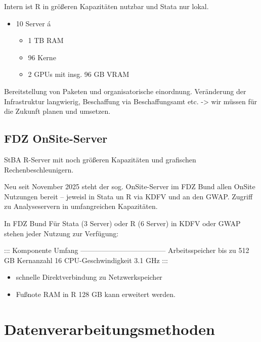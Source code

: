 \documentclass[
  german,
  10pt,
  twoside]{article}
\providecommand{\tightlist}{%
  \setlength{\itemsep}{0pt}\setlength{\parskip}{0pt}}
\begin{document}
Intern ist R in größeren Kapazitäten nutzbar und Stata nur lokal.

\begin{itemize}
\tightlist
\item
  10 Server á

  \begin{itemize}
  \tightlist
  \item
    1 TB RAM
  \item
    96 Kerne
  \item
    2 GPUs mit insg. 96 GB VRAM
  \end{itemize}
\end{itemize}

Bereitstellung von Paketen und organisatorische einordnung. Veränderung
der Infrastruktur langwierig, Beschaffung via Beschaffungsamt etc.
-\textgreater{} wir müssen für die Zukunft planen und umsetzen.

\subsection{FDZ OnSite-Server}\label{fdz-onsite-server}

StBA R-Server mit noch größeren Kapazitäten und grafischen
Rechenbeschleunigern.

Neu seit November 2025 steht der sog. OnSite-Server im FDZ Bund allen
OnSite Nutzungen bereit -- jeweisl in Stata un R via KDFV und an den
GWAP. Zugriff zu Analyseservern in umfangreichen Kapazitäten.

In FDZ Bund Für Stata (3 Server) oder R (6 Server) in KDFV oder GWAP
stehen jeder Nutzung zur Verfügung:

::: \textbar{} Komponente \textbar{} Umfang \textbar{}
\textbar---------------------\textbar---------------\textbar{}
\textbar{} Arbeitsspeicher \textbar{} bis zu 512 GB \textbar{}
\textbar{} Kernanzahl \textbar{} 16 \textbar{} \textbar{}
CPU-Geschwindigkeit \textbar{} 3.1 GHz \textbar{} :::

\begin{itemize}
\tightlist
\item
  schnelle Direktverbindung zu Netzwerkspeicher
\item
  Fußnote RAM in R 128 GB kann erweitert werden.
\end{itemize}

\section{Datenverarbeitungsmethoden}\label{sec-methoden}
\end{document}
